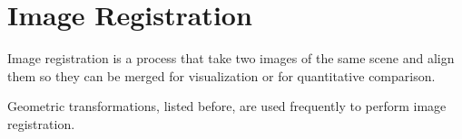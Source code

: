 \section{Image Registration}
Image registration is a process that take two images of the same scene and align them so they can be merged for visualization or for quantitative comparison. 

Geometric transformations, listed before, are used frequently to perform image registration.

